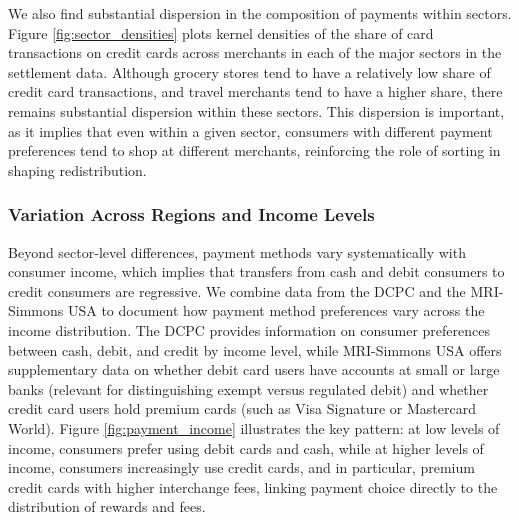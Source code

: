 \documentclass[main.tex]{subfiles}
\begin{document}
We also find substantial dispersion in the composition of payments within sectors.
Figure \ref{fig:sector_densities} plots kernel densities of the share of card transactions on credit cards across merchants in each of the major sectors in the settlement data.
Although grocery stores tend to have a relatively low share of credit card transactions, and travel merchants tend to have a higher share, there remains substantial dispersion within these sectors.
This dispersion is important, as it implies that even within a given sector, consumers with different payment preferences tend to shop at different merchants, reinforcing the role of sorting in shaping redistribution.


\subsubsection{Variation Across Regions and Income Levels}
\label{subsubsec:regional-income-variation}

Beyond sector-level differences, payment methods vary systematically with consumer income, which implies that transfers from cash and debit consumers to credit consumers are regressive.
We combine data from the DCPC and the MRI-Simmons USA to document how payment method preferences vary across the income distribution.
The DCPC provides information on consumer preferences between cash, debit, and credit by income level, while MRI-Simmons USA offers supplementary data on whether debit card users have accounts at small or large banks (relevant for distinguishing exempt versus regulated debit) and whether credit card users hold premium cards (such as Visa Signature or Mastercard World).
Figure \ref{fig:payment_income} illustrates the key pattern: at low levels of income, consumers prefer using debit cards and cash, while at higher levels of income, consumers increasingly use credit cards, and in particular, premium credit cards with higher interchange fees, linking payment choice directly to the distribution of rewards and fees.
\end{document}

